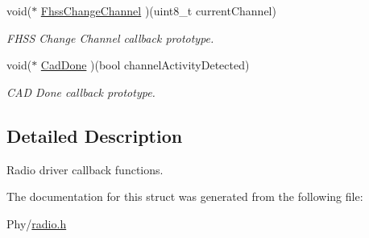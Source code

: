 \begin{DoxyCompactItemize}
void($\ast$ \hyperlink{group__LORA_ga1c7fd427d45e18c386c0dc10b496d74b}{Fhss\+Change\+Channel} )(uint8\+\_\+t current\+Channel)
\begin{DoxyCompactList}\small\item\em F\+H\+SS Change Channel callback prototype. \end{DoxyCompactList}\item 
void($\ast$ \hyperlink{group__LORA_gacf79a39fe3d615bed87b1414e73df6b2}{Cad\+Done} )(bool channel\+Activity\+Detected)
\begin{DoxyCompactList}\small\item\em C\+AD Done callback prototype. \end{DoxyCompactList}\end{DoxyCompactItemize}


\subsection{Detailed Description}
Radio driver callback functions. 

The documentation for this struct was generated from the following file\+:\begin{DoxyCompactItemize}
\item 
Phy/\hyperlink{radio_8h}{radio.\+h}\end{DoxyCompactItemize}
